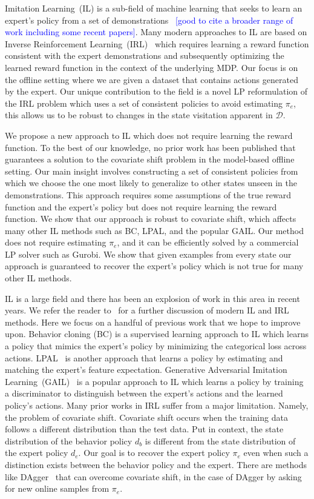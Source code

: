 \documentclass[11pt]{uai2023}
\newcommand{\mm}[1]{\textcolor{blue}{[#1]}}
\begin{document}
Imitation Learning~(IL) is a sub-field of machine learning that seeks to learn an expert's policy from a set of 
demonstrations~\cite{chang2021mitigating} \mm{good to cite a broader range of work including some recent papers}.
Many modern approaches to IL are based on Inverse Reinforcement Learning~(IRL)~\cite{abbeel2004} which requires learning a reward function consistent 
with the expert demonstrations and subsequently optimizing the learned reward function in the context of the underlying MDP. Our focus is on the offline setting where we are given a dataset that contains actions generated by the expert. Our unique contribution to the field is a novel LP reformulation of the IRL problem which uses a set of consistent policies to avoid estimating $\pi_e$, this allows us to be robust to changes in the state visitation apparent in $\mathcal{D}$. 

We propose a new approach to IL which does not require learning the reward function. To the best of our knowledge, no prior work has been published that guarantees a solution to the covariate shift problem in the model-based offline setting. Our main insight involves constructing a set of consistent policies from which we choose the one most likely to generalize to other states unseen in the demonstrations. This approach requires some assumptions of the true reward function and the expert's policy but does not require learning the reward function. 
We show that our approach is robust to covariate shift, which affects many other IL methods such as BC, LPAL, and the popular GAIL. Our method does not require estimating $\pi_e$, and 
it can be efficiently solved by a commercial LP solver such as Gurobi.
We show that given examples from every state our approach is guaranteed to recover the expert's policy which is not true for many other IL methods.

IL is a large field and there has been an explosion of work in this area in recent years. We refer the reader to~\cite{IRLSurvey2020} for a 
further discussion of modern IL and IRL methods. Here we focus on a handful of previous work that we hope to improve upon. 
Behavior cloning (BC) is a supervised learning approach to IL which learns a policy that mimics the expert's policy by 
minimizing the categorical loss across actions. LPAL~\cite{Syed2008} is another approach that learns a policy
by estimating and matching the expert's feature expectation. Generative Adversarial Imitation Learning~(GAIL)~\cite{Ho2016} is a popular
approach to IL which learns a policy by training a discriminator to distinguish between the expert's actions and the learned policy's actions.
Many prior works in IRL suffer from a major limitation. Namely, the problem of covariate shift.
Covariate shift occurs when the training data follows a different distribution than the test data. 
Put in context, the state distribution of the behavior policy $d_b$ is different from the state distribution of the expert policy $d_e$. 
Our goal is to recover the expert policy $\pi_e$ even when such a distinction exists between the behavior policy and the expert. 
There are methods like DAgger~\cite{ross_dagger} that can overcome covariate shift, in the case of DAgger by asking for new online samples from $\pi_e$.
\end{document}
